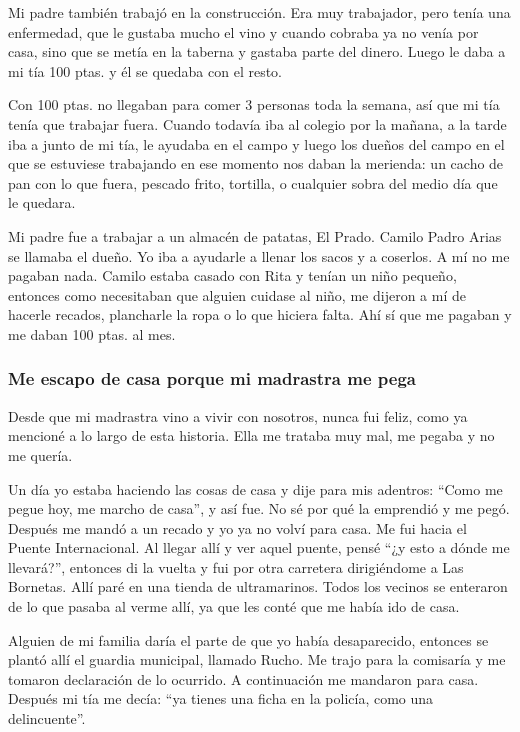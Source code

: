\documentclass[12pt,a5paper]{book}
\begin{document}
Mi padre también trabajó en la construcción. Era muy trabajador, pero tenía una enfermedad, que le gustaba mucho el vino y cuando cobraba ya no venía por casa, sino que se metía en la taberna y gastaba parte del dinero. Luego le daba a mi tía 100 ptas. y él se quedaba con el resto.

Con 100 ptas. no llegaban para comer 3 personas toda la semana, así que mi tía tenía que trabajar fuera. Cuando todavía iba al colegio por la mañana, a la tarde iba a junto de mi tía, le ayudaba en el campo y luego los dueños del campo en el que se estuviese trabajando en ese momento nos daban la merienda: un cacho de pan con lo que fuera, pescado frito, tortilla, o cualquier sobra del medio día que le quedara.

Mi padre fue a trabajar a un almacén de patatas, El Prado. Camilo Padro Arias se llamaba el dueño. Yo iba a ayudarle a llenar los sacos y a coserlos. A mí no me pagaban nada. Camilo estaba casado con Rita y tenían un niño pequeño, entonces como necesitaban que alguien cuidase al niño, me dijeron a mí de hacerle recados, plancharle la ropa o lo que hiciera falta. Ahí sí que me pagaban y me daban 100 ptas. al mes.


\subsubsection*{Me escapo de casa porque mi madrastra me pega}
Desde que mi madrastra vino a vivir con nosotros, nunca fui feliz, como ya mencioné a lo largo de esta historia. Ella me trataba muy mal, me pegaba y no me quería.

Un día yo estaba haciendo las cosas de casa y dije para mis adentros: “Como me pegue hoy, me marcho de casa”, y así fue. No sé por qué la emprendió y me pegó. Después me mandó a un recado y yo ya no volví para casa. Me fui hacia el Puente Internacional. Al llegar allí y ver aquel puente, pensé “¿y esto a dónde me llevará?”, entonces di la vuelta y fui por otra carretera dirigiéndome a Las Bornetas. Allí paré en una tienda de ultramarinos. Todos los vecinos se enteraron de lo que pasaba al verme allí, ya que les conté que me había ido de casa.

Alguien de mi familia daría el parte de que yo había desaparecido, entonces se plantó allí el guardia municipal, llamado Rucho. Me trajo para la comisaría y me tomaron declaración de lo ocurrido. A continuación me mandaron para casa. Después mi tía me decía: “ya tienes una ficha en la policía, como una delincuente”.
\end{document}
